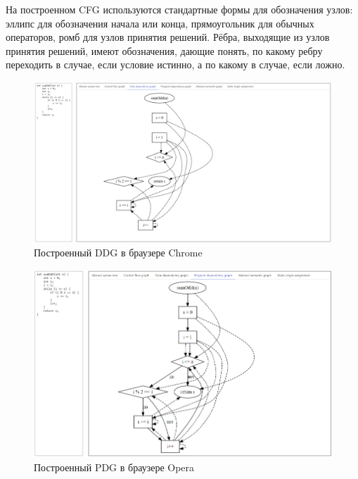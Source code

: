 На построенном CFG используются стандартные формы для обозначения узлов: эллипс для обозначения начала или конца, прямоугольник для обычных операторов, ромб для узлов принятия решений. Рёбра, выходящие из узлов принятия решений, имеют обозначения, дающие понять, по какому ребру переходить в случае, если условие истинно, а по какому в случае, если ложно.

\begin{figure}[h]
	\center
	\includegraphics [scale=0.48] {my_folder/images/my/23}
	\caption{Построенный DDG в браузере Chrome}
	\label{fig:23}
\end{figure}

\begin{figure}[h]
	\center
	\includegraphics [scale=0.65] {my_folder/images/my/24}
	\caption{Построенный PDG в браузере Opera}
	\label{fig:24}
\end{figure}

